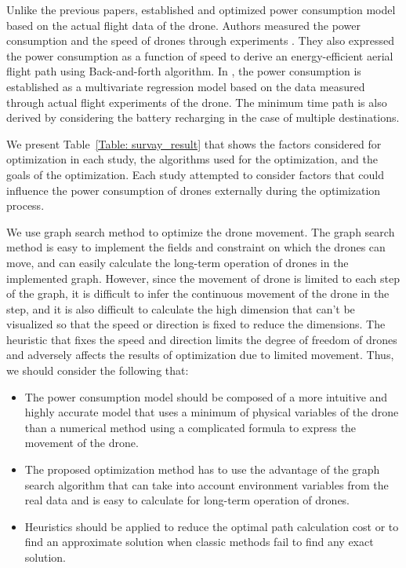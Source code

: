 \documentclass[journal]{./template/IEEEtran}
\begin{document}
Unlike the previous papers, \cite{ref_8,ref_9} established and optimized power consumption model based on the actual flight data of the drone.
Authors measured the power consumption and the speed of drones through experiments \cite{ref_8}. They also expressed the power consumption as a function of speed to derive an energy-efficient aerial flight path using Back-and-forth algorithm.
In \cite{ref_9}, the power consumption is established as a multivariate regression model based on the data measured through actual flight experiments of the drone.
The minimum time path is also derived by considering the battery recharging in the case of multiple destinations.

We present Table~\ref{Table: survay_result} that shows the factors considered for optimization in each study, the algorithms used for the optimization, and the goals of the optimization.
Each study attempted to consider factors that could influence the power consumption of drones externally during the optimization process. 

We use graph search method to optimize the drone movement. The graph search method is easy to implement the fields and constraint on which the drones can move, and can easily calculate the long-term operation of drones in the implemented graph.
However, since the movement of drone is limited to each step of the graph, it is difficult to infer the continuous movement of the drone in the step, and it is also difficult to calculate the high dimension that can’t be visualized so that the speed or direction is fixed to reduce the dimensions.
The heuristic that fixes the speed and direction limits the degree of freedom of drones and adversely affects the results of optimization due to limited movement.
Thus, we should consider the following that: 
\begin{itemize}
    \item The power consumption model should be composed of a more intuitive and highly accurate model that uses a minimum of physical variables of the drone than a numerical method using a complicated formula to express the movement of the drone.
    \item The proposed optimization method has to use the advantage of the graph search algorithm that can take into account environment variables from the real data and is easy to calculate for long-term operation of drones.
    \item Heuristics should be applied to reduce the optimal path calculation cost or to find an approximate solution when classic methods fail to find any exact solution.
\end{itemize}
\end{document}
